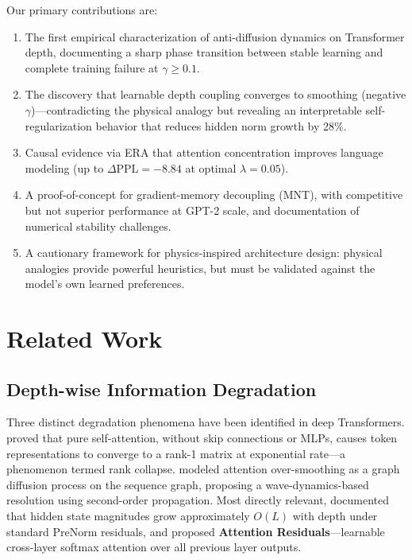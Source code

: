 \documentclass[10pt]{article}
\begin{document}
Our primary contributions are:

\begin{enumerate}[leftmargin=*,itemsep=2pt]
    \item The first empirical characterization of anti-diffusion dynamics on Transformer depth, documenting a sharp phase transition between stable learning and complete training failure at $\gamma \geq 0.1$.
    \item The discovery that learnable depth coupling converges to smoothing (negative $\gamma$)---contradicting the physical analogy but revealing an interpretable self-regularization behavior that reduces hidden norm growth by 28\%.
    \item Causal evidence via ERA that attention concentration improves language modeling (up to $\Delta \text{PPL} = -8.84$ at optimal $\lambda=0.05$).
    \item A proof-of-concept for gradient-memory decoupling (MNT), with competitive but not superior performance at GPT-2 scale, and documentation of numerical stability challenges.
    \item A cautionary framework for physics-inspired architecture design: physical analogies provide powerful heuristics, but must be validated against the model's own learned preferences.
\end{enumerate}

\section{Related Work}

\subsection{Depth-wise Information Degradation}

Three distinct degradation phenomena have been identified in deep Transformers. \cite{dong2021attention} proved that pure self-attention, without skip connections or MLPs, causes token representations to converge to a rank-1 matrix at exponential rate---a phenomenon termed rank collapse. \cite{wavy2025neurips} modeled attention over-smoothing as a graph diffusion process on the sequence graph, proposing a wave-dynamics-based resolution using second-order propagation. Most directly relevant, \cite{kimiteam2026attnres} documented that hidden state magnitudes grow approximately $O(L)$ with depth under standard PreNorm residuals, and proposed \textbf{Attention Residuals}---learnable cross-layer softmax attention over all previous layer outputs.
\end{document}
